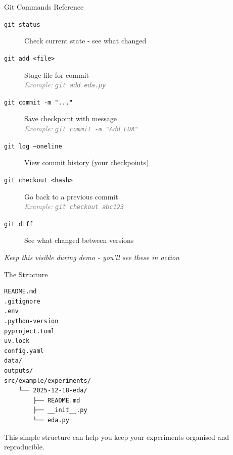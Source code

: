 \documentclass{beamer}
\begin{document}
\begin{frame}[fragile]{Git Commands Reference}
    \begin{description}
        \item[\texttt{git status}] Check current state - see what changed
        
        \item[\texttt{git add <file>}] Stage file for commit \\
        \textcolor{gray}{\textit{Example: \texttt{git add eda.py}}}
        
        \item[\texttt{git commit -m "..."}] Save checkpoint with message \\
        \textcolor{gray}{\textit{Example: \texttt{git commit -m "Add EDA"}}}
        
        \item[\texttt{git log --oneline}] View commit history (your checkpoints)
        
        \item[\texttt{git checkout <hash>}] Go back to a previous commit \\
        \textcolor{gray}{\textit{Example: \texttt{git checkout abc123}}}
        
        \item[\texttt{git diff}] See what changed between versions
    \end{description}
    
    \vspace{1em}
    \centering
    \textit{Keep this visible during demo - you'll see these in action}
    \end{frame}

\begin{frame}[fragile]{The Structure}
\begin{lstlisting}
README.md
.gitignore
.env
.python-version
pyproject.toml
uv.lock
config.yaml
data/
outputs/
src/example/experiments/
    └── 2025-12-18-eda/
        ├── README.md
        ├── __init__.py
        └── eda.py
\end{lstlisting}

\normalsize
This simple structure can help you keep your experiments organised and reproducible.
\end{frame}
\end{document}
